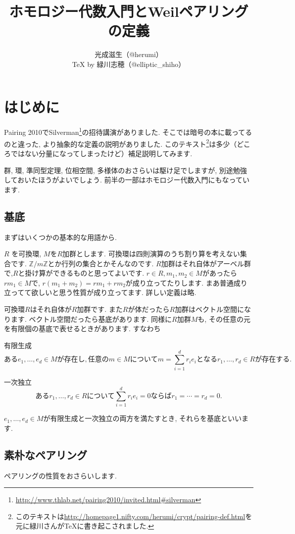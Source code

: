 \documentclass{jsarticle}
\title{ホモロジー代数入門とWeilペアリングの定義}
\author{光成滋生（@herumi）\\{\TeX} by 緑川志穂（@elliptic\_shiho）}
\date{}
\newcommand{\ZZ}{\mathbb{Z}}
\theoremstyle{definition}
\newcommand{\mydescription}[1]{
\begin{description}
\setlength{\itemindent}{2zw}
\setlength{\leftskip}{-2zw}
\setlength{\labelsep}{1zw}
#1
\end{description}
}
\numberwithin{theorem}{section}
\begin{document}
\maketitle

\tableofcontents

\section{はじめに}
Pairing 2010でSilverman\footnote{\url{http://www.thlab.net/pairing2010/invited.html\#silverman}}の招待講演がありました.
そこでは暗号の本に載ってるのと違った, より抽象的な定義の説明がありました.
このテキスト\footnote{このテキストは\url{http://homepage1.nifty.com/herumi/crypt/pairing-def.html}を元に緑川さんがTeXに書き起こされました.}は多少（どころではない分量になってしまったけど）補足説明してみます.

群, 環, 準同型定理, 位相空間, 多様体のおさらいは駆け足でしますが, 別途勉強しておいたほうがよいでしょう.
前半の一部はホモロジー代数入門にもなっています.

\subsection{基底}
まずはいくつかの基本的な用語から.

$R$ を可換環, $M$を$R$加群とします. 可換環は四則演算のうち割り算を考えない集合です. $\ZZ/m\ZZ$とか行列の集合とかそんなのです. 
$R$加群はそれ自体がアーベル群で,$R$と掛け算ができるものと思ってよいです. $r \in R, m_1, m_2 \in M$があったら$rm_1\in M$で, 
$r(m_1+m_2) = rm_1+rm_2$が成り立ってたりします. まあ普通成り立ってて欲しいと思う性質が成り立ってます. 詳しい定義は略.

可換環$R$はそれ自体が$R$加群です. また$R$が体だったら$R$加群はベクトル空間になります.
ベクトル空間だったら基底があります.
同様に$R$加群$M$も, その任意の元を有限個の基底で表せるときがあります. すなわち
\mydescription{
\item[有限生成]
\[
ある e_1, \ldots, e_d\in M が存在し, 任意の m\in Mについて m = \sum_{i=1}^d r_i e_i となる r_1, \ldots, r_d \in R が存在する.
\]
\item[一次独立]
\[
あるr_1, \ldots, r_d \in Rについて \sum_{i=1}^d r_i e_i = 0 ならば r_1=\cdots=r_d=0.
\]
}

$e_1, \ldots, e_d\in M$が有限生成と一次独立の両方を満たすとき, それらを基底といいます.

\subsection{素朴なペアリング}
ペアリングの性質をおさらいします.
\end{document}
